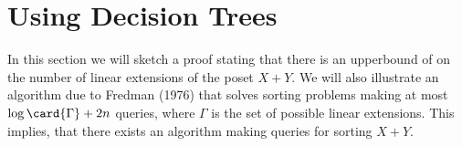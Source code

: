 \section{Using Decision Trees}
\label{tree:xy:dt}

In this section we will sketch a proof stating that there is an upperbound of 
on the number of linear extensions of the poset $X + Y$. We will also
illustrate an algorithm due to Fredman (1976) that solves sorting problems
making at most $\log\card{\Gamma} + 2n$ queries, where $\Gamma$ is the set of
possible linear extensions. This implies, that there exists an
algorithm making  queries for sorting $X + Y$.
